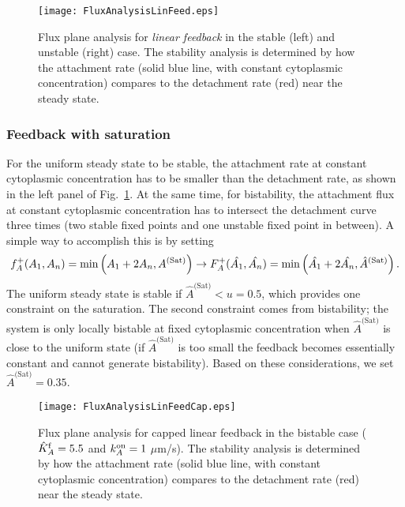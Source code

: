 \documentclass[11pt]{article}
\newcommand{\6}[1]{#1_{\text{6}}}
\newcommand{\3}[1]{#1_{\text{3}}}
\newcommand{\Sat}[1]{#1^\text{(Sat)}}
\begin{document}
\begin{figure}
\centering
\texttt{[image: FluxAnalysisLinFeed.eps]}
\caption{\label{fig:P3Linear}Flux plane analysis for \emph{linear feedback} in the stable (left) and unstable (right) case. The stability analysis is determined by how the attachment rate (solid blue line, with constant cytoplasmic concentration) compares to the detachment rate (red) near the steady state.}
\end{figure}

\subsubsection{Feedback with saturation}
For the uniform steady state to be stable, the attachment rate at constant cytoplasmic concentration has to be smaller than the detachment rate, as shown in the left panel of Fig.\ \ref{fig:P3Linear}. At the same time, for bistability, the attachment flux at constant cytoplasmic concentration has to intersect the detachment curve three times (two stable fixed points and one unstable fixed point in between). A simple way to accomplish this is by setting
\begin{equation}
f_A^+(\MA,\PA) =\min\left(\MA+2\PA,\Sat{A}\right) \rightarrow F_A^+(\hat \MA, \hat \PA) = \min\left(\hat \MA+2\hat \PA, \Sat{\hat A}\right). 
\end{equation}
The uniform steady state is stable if $\Sat{\hat A} < u = 0.5$, which provides one constraint on the saturation. The second constraint comes from bistability; the system is only locally bistable at fixed cytoplasmic concentration when $\Sat{\hat A}$ is close to the uniform state (if $\Sat{\hat A}$ is too small the feedback becomes essentially constant and cannot generate bistability). Based on these considerations, we set $\Sat{\hat A}=0.35$. 


\begin{figure}
\centering
\texttt{[image: FluxAnalysisLinFeedCap.eps]}
\caption{\label{fig:P3Cap}Flux plane analysis for capped linear feedback in the bistable case ($\hat{K}^\text{f}_A=5.5$ and $k^\text{on}_A=1$ $\mu$m/s). The stability analysis is determined by how the attachment rate (solid blue line, with constant cytoplasmic concentration) compares to the detachment rate (red) near the steady state. }
\end{figure}
\end{document}
